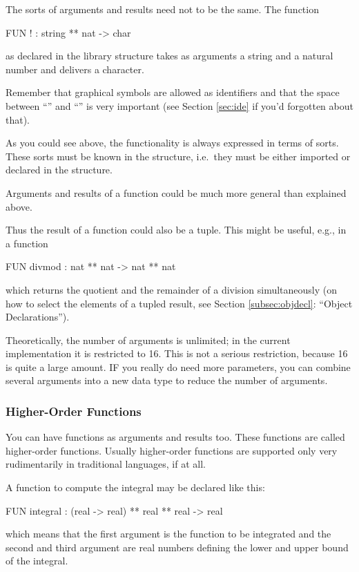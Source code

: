  The sorts of arguments and results need not to be the
same. The function
\begin{prog}
        FUN ! : string ** nat -> char
\end{prog}
as declared in the library structure   takes as
arguments a string and a natural number and delivers a character.

Remember that graphical symbols are allowed as identifiers and that
the space between ``\pro{!}'' and  ``\pro{:}'' is very
important (see Section \ref{sec:ide} if you'd  forgotten about that).

\medskip
As you could see above, the functionality is always expressed in terms
of sorts. 
These sorts must be known in the structure, i.e.~they must be either
 imported or declared in the structure.

\advanced  Arguments and results of a function could be much
more general than explained above.

Thus the result of a function could also be a tuple. 
This might be useful, e.g., in a function
\begin{prog}
        FUN divmod : nat ** nat -> nat ** nat
\end{prog}
which returns the quotient and the remainder of a division
simultaneously (on how to select the elements of a tupled result, see
Section \ref{subsec:objdecl}: ``Object Declarations'').

\medskip
\experienced Theoretically, the number of arguments is unlimited; in the current
implementation it is restricted to 16. 
This is not a serious restriction, because  16 is
quite a large amount.
IF you really do need more parameters, you can combine several
arguments into a new data type to reduce the number of arguments. 

\subsubsection{Higher-Order Functions}
\label{sec:higherOrderFunctions}

\advanced You can have functions as arguments and results too.
These functions are called higher-order functions.
Usually higher-order functions are supported only very rudimentarily
in traditional languages, if at all.

 A function to compute the integral may be declared like this:
\begin{prog}
        FUN integral : (real -> real) ** real ** real -> real
\end{prog}
which means that the first argument is the function to be
integrated and the second and third argument are real numbers defining
the lower and upper bound of the integral.

